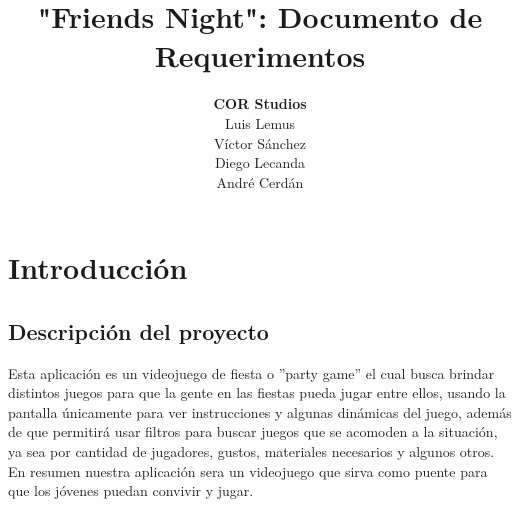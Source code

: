 \documentclass[12pt, oneside, letterpaper]{book}
\begin{document}
\title{\textbf{"Friends Night"}: Documento de Requerimentos}

\author{\textbf{COR Studios}\\Luis Lemus\\Víctor Sánchez\\ Diego Lecanda\\André Cerdán}


\maketitle
\newpage
\frontmatter
\tableofcontents{}

\newpage
\mainmatter
\part{Introducción}
\chapter{Descripción del proyecto}
\par
Esta aplicación es un videojuego de fiesta o ''party game'' el cual busca brindar distintos juegos para que la gente en las fiestas pueda jugar entre ellos, usando la pantalla únicamente para ver instrucciones y algunas dinámicas del juego, además de que permitirá usar filtros para buscar juegos que se acomoden a la situación, ya sea por cantidad de jugadores, gustos, materiales necesarios y algunos otros. En resumen nuestra aplicación sera un videojuego que sirva como puente para que los jóvenes puedan convivir y jugar. 

\end{document}
